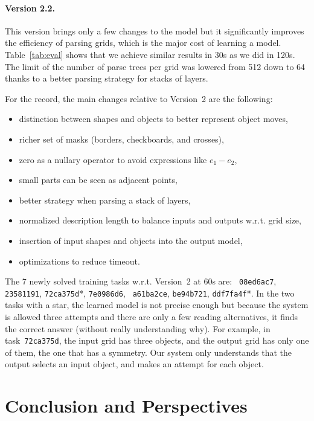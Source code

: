 \documentclass[a4paper]{llncs}
\begin{document}
\paragraph{Version 2.2.} This version brings only a few changes to the
model but it significantly improves the efficiency of parsing grids,
which is the major cost of learning a model. Table~\ref{tab:eval}
shows that we achieve similar results in 30s as we did in 120s. The
limit of the number of parse trees per grid was lowered from 512 down
to 64 thanks to a better parsing strategy for stacks of layers.

For the record, the main changes relative to Version~2 are the following:
\begin{itemize}
\item distinction between shapes and objects to better represent object moves,
\item richer set of masks (borders, checkboards, and crosses),
\item zero as a nullary operator to avoid expressions like $e_1 - e_2$,
\item small parts can be seen as adjacent points,
\item better strategy when parsing a stack of layers,
\item normalized description length to balance inputs and outputs w.r.t. grid size,
\item insertion of input shapes and objects into the output model,
\item optimizations to reduce timeout.
\end{itemize}

The 7 newly solved training tasks w.r.t. Version~2 at 60s are: {\tt
  08ed6ac7}, {\tt 23581191}, {\tt 72ca375d}*, {\tt 7e0986d6}, {\tt
  a61ba2ce}, {\tt be94b721}, {\tt ddf7fa4f}*. In the two tasks with a
star, the learned model is not precise enough but because the system
is allowed three attempts and there are only a few reading
alternatives, it finds the correct answer (without really
understanding why). For example, in task~{\tt 72ca375d}, the input
grid has three objects, and the output grid has only one of them, the
one that has a symmetry. Our system only understands that the output
selects an input object, and makes an attempt for each object.


\section{Conclusion and Perspectives}
\label{conclu}



\end{document}
